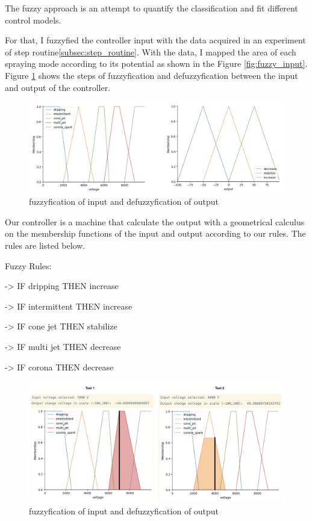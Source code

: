         The fuzzy approach is an attempt to quantify the classification and fit different control models.

        For that, I fuzzyfied the controller input with the data acquired in an experiment of step routine\ref{subsec:step_routine}. With the data, I mapped the area of each spraying mode according to its potential as shown in the Figure \ref{fig:fuzzy_input}.
        Figure \ref{fig:fuzzyy} shows the steps of fuzzyfication and defuzzyfication between the input and output of the controller.


            \begin{figure}[H]
                \centering
                \includegraphics[width=17cm]{Figuras/fuzzy/Fuzzyy.png}
                \caption{fuzzyfication of input and defuzzyfication of output}
                \label{fig:fuzzyy}
            \end{figure}



        Our controller is a machine that calculate the output with a geometrical calculus on the membership functions of the input and output according to our rules.
        The rules are listed below.

        Fuzzy Rules:

        -> IF dripping THEN increase

        -> IF intermittent THEN increase

        -> IF cone jet THEN stabilize

        -> IF multi jet THEN decrease

        -> IF corona THEN decrease


    \begin{figure}[H]
        \centering
        \includegraphics[width=17cm]{Figuras/fuzzy/test3.png}
        \caption{fuzzyfication of input and defuzzyfication of output}
        \label{fig:fuzzyy1}
    \end{figure}
        
